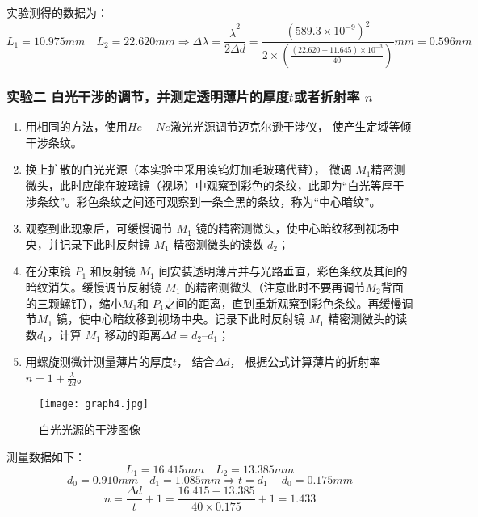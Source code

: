 \documentclass[dvipsnames, svgnames,a4paper,11pt]{article}
\begin{document}
		实验测得的数据为：
		\[ 
		L_1=10.975mm \quad L_2=22.620mm \Longrightarrow \Delta\lambda=\frac{\bar{\lambda}^2}{2\Delta d}=\frac{(589.3\times10^{-9})^2}{2\times(\frac{(22.620-11.645)\times10^{-3}}{40})}mm=0.596nm
		 \]
		

		
		
		
		
		

	\subsubsection{实验二 白光干涉的调节，并测定透明薄片的厚度$t$或者折射率 $n$}
		
		\begin{enumerate}
			\item 用相同的方法，使用$He-Ne$激光光源调节迈克尔逊干涉仪， 使产生定域等倾干涉条纹。
			
			\item 换上扩散的白光光源（本实验中采用溴钨灯加毛玻璃代替）， 微调 $M_1$精密测微头，此时应能在玻璃镜（视场）中观察到彩色的条纹，此即为“白光等厚干涉条纹”。彩色条纹之间还可观察到一条全黑的条纹，称为“中心暗纹”。
			
			\item 观察到此现象后，可缓慢调节 $M_1$ 镜的精密测微头，使中心暗纹移到视场中央，并记录下此时反射镜 $M_1$ 精密测微头的读数 $d_2$；
			
			\item 在分束镜 $P_1$ 和反射镜 $M_1$ 间安装透明薄片并与光路垂直，彩色条纹及其间的暗纹消失。缓慢调节反射镜 $M_1$ 的精密测微头（注意此时不要再调节$M_2$背面的三颗螺钉），缩小$ M_1 $和 $P_1$之间的距离，直到重新观察到彩色条纹。再缓慢调节$ M_1$ 镜，使中心暗纹移到视场中央。记录下此时反射镜 $M_1$ 精密测微头的读数$ d_1$，计算 $M_1$ 移动的距离$\Delta d = d_2 – d_1$；
			
			\item 用螺旋测微计测量薄片的厚度$ t$， 结合$\Delta d$， 根据公式计算薄片的折射率 $n=1+\frac{\lambda}{2d}$。
		\end{enumerate}
		
		\begin{figure}[htbp]
			\centering
			\texttt{[image: graph4.jpg]}
			\caption{白光光源的干涉图像}
			\label{fig:graph4}
		\end{figure}
		
		测量数据如下：
		\[ 
		L_1=16.415mm \quad L_2=13.385mm
		 \]
		\[ 
		d_0=0.910mm \quad d_1=1.085mm\Longrightarrow t=d_1-d_0=0.175mm
		 \]
		\[ 
		n=\frac{\Delta d}{t}+1=\frac{16.415-13.385}{40\times0.175}+1=1.433
		 \]
		
\end{document}
